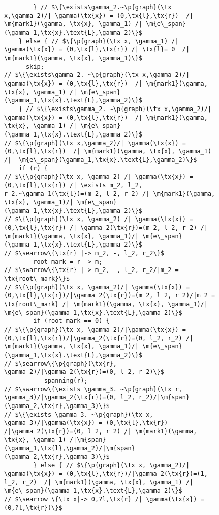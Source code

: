 \documentclass{article}
\newcommand{\tx}[1]{\text{#1}}
\newcommand{\p}[1]{\ensuremath{\mathsf{#1}}} %
\newcommand{\m}[1]{\ensuremath{\mathit{#1}}} %
\begin{document}
\begin{figure}[t]
\begin{lstlisting}
        } // $\{\exists\gamma_2.~\p{graph}(\tx x,\gamma_2)/| \gamma(\tx{x}) = (0,\tx{l},\tx{r})  /| \m{mark1}(\gamma, \tx{x}, \gamma_1) /| \m{e\_span}(\gamma_1,\tx{x}.\text{L},\gamma_2)\}$
    } else { // $\{\p{graph}(\tx x, \gamma_1) /| \gamma(\tx{x}) = (0,\tx{l},\tx{r}) /| \tx{l}= 0  /| \m{mark1}(\gamma, \tx{x}, \gamma_1)\}$
      skip;
// $\{\exists\gamma_2. ~\p{graph}(\tx x,\gamma_2)/| \gamma(\tx{x}) = (0,\tx{l},\tx{r})  /| \m{mark1}(\gamma, \tx{x}, \gamma_1) /| \m{e\_span}(\gamma_1,\tx{x}.\text{L},\gamma_2)\}$
    } // $\{\exists\gamma_2. ~\p{graph}(\tx x,\gamma_2)/| \gamma(\tx{x}) = (0,\tx{l},\tx{r})  /| \m{mark1}(\gamma, \tx{x}, \gamma_1) /| \m{e\_span}(\gamma_1,\tx{x}.\text{L},\gamma_2)\}$
// $\{\p{graph}(\tx x,\gamma_2)/| \gamma(\tx{x}) = (0,\tx{l},\tx{r})  /| \m{mark1}(\gamma, \tx{x}, \gamma_1) /|  \m{e\_span}(\gamma_1,\tx{x}.\text{L},\gamma_2)\}$
    if (r) {
// $\{\p{graph}(\tx x, \gamma_2) /| \gamma(\tx{x}) = (0,\tx{l},\tx{r}) /| \exists m_2, l_2, r_2.~\gamma_1(\tx{l})=(m_2, l_2, r_2) /| \m{mark1}(\gamma, \tx{x}, \gamma_1)/| \m{e\_span}(\gamma_1,\tx{x}.\text{L},\gamma_2)\}$
// $\{\p{graph}(\tx x, \gamma_2) /| \gamma(\tx{x}) = (0,\tx{l},\tx{r}) /| \gamma_2(\tx{r})=(m_2, l_2, r_2) /| \m{mark1}(\gamma, \tx{x}, \gamma_1)/| \m{e\_span}(\gamma_1,\tx{x}.\text{L},\gamma_2)\}$
// $\searrow\{\tx{r} |-> m_2, -, l_2, r_2\}$
        root_mark = r -> m;
// $\swarrow\{\tx{r} |-> m_2, -, l_2, r_2/|m_2 = \tx{root\_mark}\}$
// $\{\p{graph}(\tx x, \gamma_2)/| \gamma(\tx{x}) = (0,\tx{l},\tx{r})/|\gamma_2(\tx{r})=(m_2, l_2, r_2)/|m_2 = \tx{root\_mark} /| \m{mark1}(\gamma, \tx{x}, \gamma_1)/| \m{e\_span}(\gamma_1,\tx{x}.\text{L},\gamma_2)\}$
        if (root_mark == 0) {
// $\{\p{graph}(\tx x, \gamma_2)/|\gamma(\tx{x}) = (0,\tx{l},\tx{r})/|\gamma_2(\tx{r})=(0, l_2, r_2) /| \m{mark1}(\gamma, \tx{x}, \gamma_1)/| \m{e\_span}(\gamma_1,\tx{x}.\text{L},\gamma_2)\}$
// $\searrow\{\p{graph}(\tx{r}, \gamma_2)/|\gamma_2(\tx{r})=(0, l_2, r_2)\}$
           spanning(r);
// $\swarrow\{\exists \gamma_3. ~\p{graph}(\tx r, \gamma_3)/|\gamma_2(\tx{r})=(0, l_2, r_2)/|\m{span}(\gamma_2,\tx{r},\gamma_3)\}$
// $\{\exists \gamma_3. ~\p{graph}(\tx x, \gamma_3)/|\gamma(\tx{x}) = (0,\tx{l},\tx{r}) /|\gamma_2(\tx{r})=(0, l_2, r_2) /| \m{mark1}(\gamma, \tx{x}, \gamma_1) /|\m{span}(\gamma_1,\tx{l},\gamma_2)/|\m{span}(\gamma_2,\tx{r},\gamma_3)\}$
        } else { // $\{\p{graph}(\tx x, \gamma_2)/| \gamma(\tx{x}) = (0,\tx{l},\tx{r})/|\gamma_2(\tx{r})=(1, l_2, r_2)  /| \m{mark1}(\gamma, \tx{x}, \gamma_1) /| \m{e\_span}(\gamma_1,\tx{x}.\text{L},\gamma_2)\}$
// $\searrow \{\tx x|-> 0,?l,\tx{r} /| \gamma(\tx{x}) = (0,?l,\tx{r})\}$

\end{lstlisting}
\end{figure}
\end{document}
